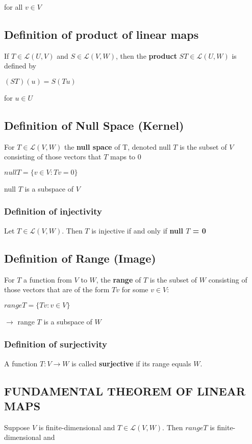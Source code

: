 \documentclass{article}
\begin{document}
\parindent=0pt for all $v \in V$


\subsection{Definition of product of linear maps}
If $T \in \mathcal{L}(U,V)$ and $S \in \mathcal{L}(V,W)$, then the \textbf{product} $ST \in \mathcal{L}(U,W)$ is defined by
\vspace{4pt}

\centerline{$(ST)(u)=S(Tu)$}

for $u \in U$


\subsection{Definition of Null Space (Kernel)}
For $T \in \mathcal{L}(V,W)$ the \textbf{null space} of T, denoted null $T$ is the subset of $V$ consisting of those vectors that $T$ maps to 0
\vspace{4pt}

\centerline{$null T = \{v \in V: Tv=0\}$}

null $T$ is a subspace of $V$
\subsubsection{Definition of injectivity}
Let $T \in \mathcal{L}(V,W)$. Then $T$ is injective if and only if \textbf{null $T$ = {0}}

\subsection{Definition of Range (Image)}
For $T$ a function from $V$ to $W$, the \textbf{range} of $T$ is the subset of $W$ consisting of those vectors that are of the form $Tv$ for some $v \in V$:
\vspace{4pt}

\centerline{$range T = \{Tv : v \in V\}$}

$\rightarrow$ range $T$ is a subspace of $W$

\subsubsection{Definition of surjectivity}
A function $T: V \to W$ is called \textbf{surjective} if its range equals $W$.

\vspace{10pt}
\subsection{FUNDAMENTAL THEOREM OF LINEAR MAPS}
Suppose $V$ is finite-dimensional and $T \in \mathcal{L}(V,W)$. Then $range T$ is finite-dimensional and
\vspace{4pt}
\end{document}
